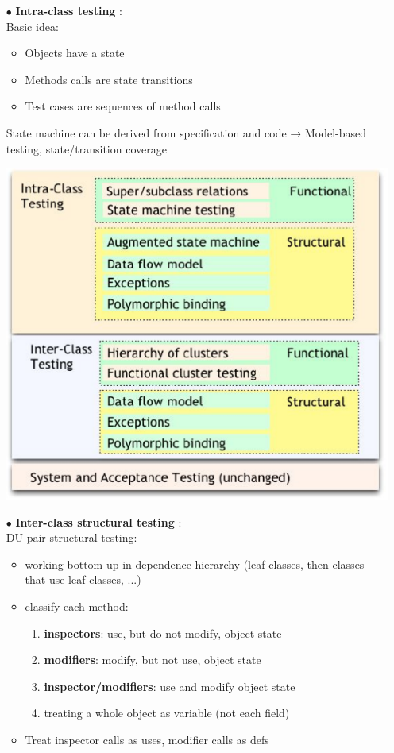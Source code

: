 \documentclass{article}
\begin{document}
\begin{multicols}{2}
\begin{itemize}
    \item [$\bullet$]\textbf{Intra-class testing} :\\
    Basic idea:
    \begin{itemize}
        \item Objects have a state
        \item Methods calls are state transitions
        \item Test cases are sequences of method calls
    \end{itemize}
    State machine can be derived from specification and code → Model-based testing, state/transition coverage
    \begin{center}
    \includegraphics[scale = 0.4]{image/21.PNG}
\end{center}
    \vfill\null\columnbreak
    \item [$\bullet$]\textbf{Inter-class structural testing} :\\
    DU pair structural testing:
    \begin{itemize}
        \item  working bottom-up in dependence hierarchy (leaf classes, then classes that use leaf classes, ...)
        \item classify each method:
        \begin{enumerate}
            \item \textbf{inspectors}: use, but do not modify, object state
            \item \textbf{modifiers}: modify, but not use, object state
            \item \textbf{inspector/modifiers}: use and modify object state
            \item treating a whole object as variable (not each field)
        \end{enumerate}
        \item Treat inspector calls as uses, modifier calls as defs\\
    \end{itemize}
    

\end{itemize}
\end{multicols}
\end{document}
